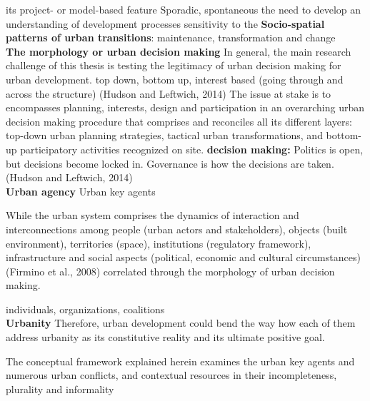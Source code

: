 \documentclass[11pt]{report}
\begin{document}
its project- or model-based feature 
Sporadic, spontaneous
the need to develop an understanding of development processes
sensitivity to the 
\textbf{Socio-spatial patterns of urban transitions}: maintenance, transformation and change
\\
\textbf{The morphology or urban decision making}
In general, the main research challenge of this thesis is testing the legitimacy of urban decision making for urban development.  
top down, bottom up, interest based (going through and across the structure) (Hudson and Leftwich, 2014)
The issue at stake is to encompasses planning, interests, design and participation in an overarching urban decision making procedure that comprises and reconciles all its different layers: top-down urban planning strategies, tactical urban transformations, and bottom-up participatory activities recognized on site.
\textbf{decision making:}
Politics is open, but decisions become locked in. Governance is how the decisions are taken. (Hudson and Leftwich, 2014)
\\
\textbf{Urban agency}
Urban key agents

While the urban system comprises the dynamics of  interaction  and  interconnections among people (urban actors and stakeholders), objects (built environment), territories (space), institutions (regulatory framework), infrastructure and social  aspects (political, economic and cultural circumstances) (Firmino et al., 2008) correlated through the morphology of urban decision making. 

individuals, organizations, coalitions
\\
\textbf{Urbanity}
Therefore, urban development could bend the way how each of them address urbanity as its constitutive reality and its ultimate positive goal.

The conceptual framework explained herein examines the urban key agents and numerous urban conflicts,  and contextual resources in their incompleteness, plurality and informality
\end{document}
